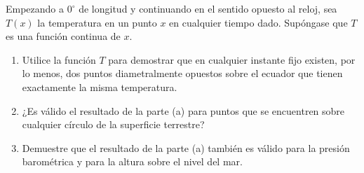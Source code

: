 \item Empezando a $0^\circ$ de longitud y continuando en el sentido opuesto al reloj, sea $T(x)$ la temperatura en un punto $x$ en cualquier tiempo dado. Supóngase que $T$ es una función continua de $x$.
\begin{enumerate}
    \item[(a)] Utilice la función $T$ para demostrar que en cualquier instante fijo existen, por lo menos, dos puntos diametralmente opuestos sobre el ecuador que tienen exactamente la misma temperatura.
    \item[(b)] ¿Es válido el resultado de la parte (a) para puntos que se encuentren sobre cualquier círculo de la superficie terrestre?
    \item[(c)] Demuestre que el resultado de la parte (a) también es válido para la presión barométrica y para la altura sobre el nivel del mar.
\end{enumerate}
